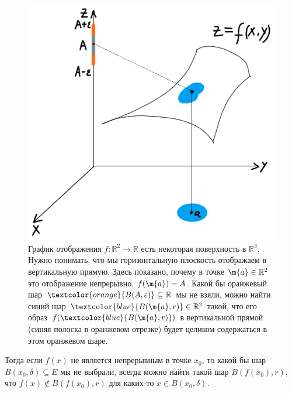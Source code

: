 \begin{figure}[h!]
    \centering
    \includegraphics[scale=0.5]{images/continous3.jpg}
    \caption{График отображения $f: \mathbb{R}^2 \to \mathbb{R}$ есть некоторая поверхность в $\mathbb{R}^3$. Нужно понимать, что мы горизонтальную плоскость отображаем в вертикальную прямую. Здесь показано, почему в точке $\m{a}\in \mathbb{R}^2$ это отображение непрерывно, $f(\m{a}) = A$. Какой бы оранжевый шар $\textcolor{orange}{B(A, \varepsilon)} \subseteq \mathbb{R}$ мы не взяли, можно найти синий шар $\textcolor{blue}{B(\m{a},r)} \in \mathbb{R}^2$ такой, что его образ $f( \textcolor{blue}{B(\m{a}, r)} )$ в вертикальной прямой (синяя полоска в оранжевом отрезке) будет целиком содержаться в этом оранжевом шаре.}
    \label{fig:enter-label}
\end{figure}


\begin{remark}\label{not_continous}
    Тогда если $f(x)$ не является непрерывным в точке $x_0$, то какой бы шар $B(x_0, \delta) \subseteq E$ мы не выбрали, всегда можно найти такой шар $B(f(x_0),r)$, что $f(x) \notin B(f(x_0),r)$ для каких-то $x \in B(x_0, \delta).$
\end{remark}




